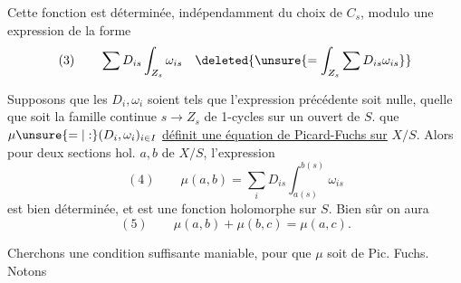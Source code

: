 Cette fonction est déterminée, indépendamment du choix de $C_s$, modulo une expression de la forme
\[
(3)\qquad \sum D_{is}\int_{Z_s}\omega_{is}\quad
\deleted{\unsure{=\int_{Z_s}\sum D_{is}\omega_{is}}}
\]

Supposons que les $D_i,\omega_i$ soient tels que l'expression précédente soit nulle, quelle que soit  la famille continue $s\longrightarrow Z_s$ de 1-cycles  sur un ouvert de $S$.   que  $\mu\unsure{=|:}(D_i,\omega_i)_{i\in I}$ \uline{définit une équation de Picard-Fuchs sur} $X/S$. Alors pour deux sections hol.  $a,b$ de $X/S$, l'expression
\[
(4)\qquad \mu(a,b)=\sum_i D_{is}\int_{a(s)}^{b(s)}\omega_{is}
\]
est bien déterminée, et est une fonction holomorphe sur $S$. Bien sûr on aura
\[
(5)\qquad \mu(a,b)+\mu(b,c)=\mu(a,c).
\]

Cherchons une condition suffisante maniable,    pour que $\mu$ soit de Pic. Fuchs. Notons
